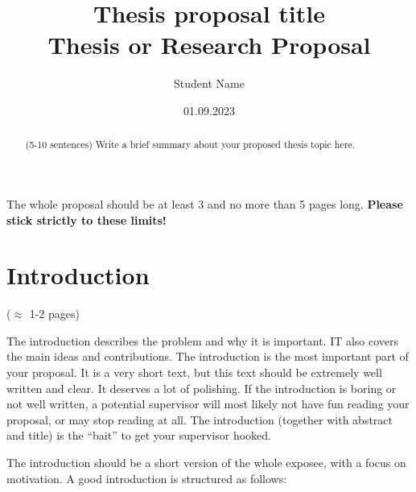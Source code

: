 \documentclass[12pt]{article}
\newcommand{\trauthor}{Student Name}
\newcommand{\trtype}{Thesis or Research Proposal} %
\newcommand{\trtitle}{Thesis proposal title}
\newcommand{\trdate}{01.09.2023}
\theoremstyle{plain}
\theoremstyle{definition}
\theoremstyle{remark}
\begin{document}
\renewcommand{\headheight}{14.5pt}

\fancyhead{}
\fancyhead[CO]{\trtitle}

\title{\trtitle\\[0.3cm]{\normalsize\trtype}}
\author{\trauthor}
\date{\trdate}

\maketitle


\thispagestyle{empty}
 The whole proposal should be at least 3 and no more than 5 pages long. \textbf{Please stick strictly to these limits!}
\begin{abstract}
  (5-10 sentences) Write a brief summary about your proposed thesis topic here.
\end{abstract}


\section{Introduction}
\label{sec:introduction}
($\approx$ 1-2 pages) 

The introduction describes the problem and why it is important. IT also covers the main ideas and contributions. The introduction is the most important part of your proposal. It is a very short text, but this text should be extremely well written and clear. It deserves a lot of polishing. If the introduction is boring or not well written, a potential supervisor will most likely not have fun reading your proposal, or may stop reading at all. The introduction (together with abstract and title) is the ``bait'' to get your supervisor hooked.

The introduction should be a short version of the whole exposee, with a focus on motivation. A good introduction is structured as follows:
\end{document}
